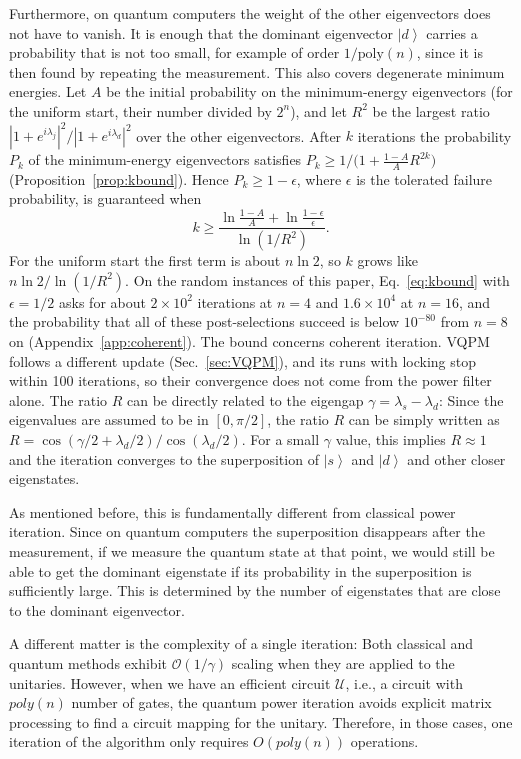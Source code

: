 \documentclass[onecolumn,10pt]{article}
\newcommand{\ket}[1]{\ensuremath{\left|#1\right\rangle}} %
\theoremstyle{remark}
\theoremstyle{plain}
\begin{document}
Furthermore, on quantum computers the weight of the other eigenvectors does not have to vanish. It is enough that the dominant eigenvector \ket{d} carries a probability that is not too small, for example of order $1/\mathrm{poly}(n)$, since it is then found by repeating the measurement. This also covers degenerate minimum energies. Let $A$ be the initial probability on the minimum-energy eigenvectors (for the uniform start, their number divided by $2^n$), and let $R^2$ be the largest ratio $|1+e^{i\lambda_j}|^2/|1+e^{i\lambda_d}|^2$ over the other eigenvectors. After $k$ iterations the probability $P_k$ of the minimum-energy eigenvectors satisfies $P_k\ge1/\bigl(1+\frac{1-A}{A}R^{2k}\bigr)$ (Proposition~\ref{prop:kbound}). Hence $P_k\ge1-\epsilon$, where $\epsilon$ is the tolerated failure probability, is guaranteed when
\begin{equation}
\label{eq:kbound}
k \geq \frac{\ln\frac{1-A}{A}+\ln\frac{1-\epsilon}{\epsilon}}{\ln(1/R^2)}.
\end{equation}
For the uniform start the first term is about $n\ln2$, so $k$ grows like $n\ln2/\ln(1/R^2)$. On the random instances of this paper, Eq.~\eqref{eq:kbound} with $\epsilon=1/2$ asks for about $2\times10^2$ iterations at $n=4$ and $1.6\times10^4$ at $n=16$, and the probability that all of these post-selections succeed is below $10^{-80}$ from $n=8$ on (Appendix~\ref{app:coherent}). The bound concerns coherent iteration. VQPM follows a different update (Sec.~\ref{sec:VQPM}), and its runs with locking stop within 100 iterations, so their convergence does not come from the power filter alone.
The ratio $R$ can be directly related to the eigengap $\gamma = \lambda_s - \lambda_d$: Since the eigenvalues are assumed to be in $[0, \pi/2]$, the ratio $R$ can be simply written as $R = \cos(\gamma/2 + \lambda_d/2)/\cos(\lambda_d/2)$. For a small $\gamma$ value, this implies $R \approx 1$ and the iteration converges to the superposition of \ket{s} and \ket{d} and other closer eigenstates.

As mentioned before, this is fundamentally different from classical power iteration. Since on quantum computers the superposition disappears after the measurement, if we measure the quantum state at that point, we would still be able to get the dominant eigenstate if its probability in the superposition is sufficiently large. This is determined by the number of eigenstates that are close to the dominant eigenvector.

A different matter is the complexity of a single iteration: Both classical and quantum methods exhibit $\mathcal{O}(1/\gamma)$ scaling when they are applied to the unitaries. However, when we have an efficient circuit $\mathcal{U}$, i.e., a circuit with $poly(n)$ number of gates, the quantum power iteration avoids explicit matrix processing to find a circuit mapping for the unitary. Therefore, in those cases, one iteration of the algorithm only requires $O(poly(n))$ operations.
\end{document}
